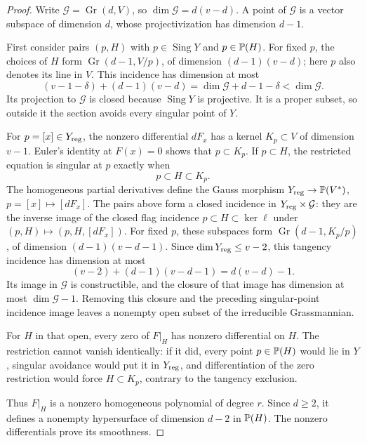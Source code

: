 \begin{proof}
Write \(\mathcal G=\operatorname{Gr}(d,V)\), so
\(\dim\mathcal G=d(v-d)\).  A point of \(\mathcal G\) is a vector
subspace of dimension \(d\), whose projectivization has dimension
\(d-1\).

First consider pairs \((p,H)\) with
\(p\in\operatorname{Sing}Y\) and \(p\in\mathbb P(H)\).
For fixed \(p\), the choices of \(H\) form
\(\operatorname{Gr}(d-1,V/p)\), of dimension \((d-1)(v-d)\);
here \(p\) also denotes its line in \(V\).  This incidence has
dimension at most
\[
 (v-1-\delta)+(d-1)(v-d)
 =\dim\mathcal G+d-1-\delta
 <\dim\mathcal G.
\]
Its projection to \(\mathcal G\) is closed because
\(\operatorname{Sing}Y\) is projective.  It is a proper subset, so
outside it the section avoids every singular point of \(Y\).

For \(p=[x]\in Y_{\rm reg}\), the nonzero differential \(dF_x\)
has a kernel \(K_p\subset V\) of dimension \(v-1\).  Euler's
identity at \(F(x)=0\) shows that \(p\subset K_p\).
If \(p\subset H\), the restricted equation is singular at \(p\)
exactly when
\[
 p\subset H\subset K_p.
\]
The homogeneous partial derivatives define the Gauss morphism
\(Y_{\rm reg}\to\mathbb P(V^*)\), \(p=[x]\mapsto[dF_x]\).
The pairs above form a closed incidence in \(Y_{\rm reg}\times\mathcal G\):
they are the inverse image of the closed flag incidence
\(p\subset H\subset\ker\ell\) under \((p,H)\mapsto(p,H,[dF_x])\).
For fixed \(p\), these subspaces form
\(\operatorname{Gr}(d-1,K_p/p)\), of dimension
\((d-1)(v-d-1)\).  Since \(\dim Y_{\rm reg}\le v-2\), this
tangency incidence has dimension at most
\[
 (v-2)+(d-1)(v-d-1)=d(v-d)-1.
\]
Its image in \(\mathcal G\) is constructible, and the closure of
that image has dimension at most \(\dim\mathcal G-1\).
Removing this closure and the preceding singular-point incidence
image leaves a nonempty open subset of the irreducible
Grassmannian.

For \(H\) in that open, every zero of \(F|_H\) has nonzero
differential on \(H\).  The restriction cannot vanish identically:
if it did, every point \(p\in\mathbb P(H)\) would lie in \(Y\), singular
avoidance would put it in \(Y_{\rm reg}\), and differentiation of
the zero restriction would force \(H\subset K_p\), contrary to
the tangency exclusion.

Thus \(F|_H\) is a nonzero homogeneous polynomial of degree \(r\).
Since \(d\ge2\), it defines a nonempty hypersurface of dimension
\(d-2\) in \(\mathbb P(H)\).  The nonzero differentials prove its
smoothness.
\end{proof}

